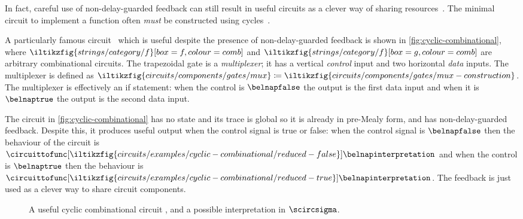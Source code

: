 \documentclass{lmcs}
\begin{document}
In fact, careful use of non-delay-guarded feedback can still result in useful
circuits as a clever way of sharing
resources~\cite{malik1994analysis,riedel2004cyclic,mendler2012constructive}.
The minimal circuit to implement a function often \emph{must} be
constructed using cycles~\cite{rivest1977necessity,riedel2003synthesis}.

\begin{exa}\label{ex:cyclic-combinational}
    A particularly famous circuit~\cite{malik1994analysis} which is useful
    despite the presence of non-delay-guarded feedback is shown in
    \autoref{fig:cyclic-combinational}, where \(
    \iltikzfig{strings/category/f}[box=f,colour=comb]
    \) and \(
    \iltikzfig{strings/category/f}[box=g,colour=comb]
    \) are arbitrary combinational circuits.
    The trapezoidal gate is a \emph{multiplexer}; it has a vertical
    \emph{control} input and two horizontal \emph{data} inputs.
    The multiplexer is defined as \(
    \iltikzfig{circuits/components/gates/mux}
    \coloneqq
    \iltikzfig{circuits/components/gates/mux-construction}
    \).
    The multiplexer is effectively an if statement: when the control is
    \(\belnapfalse\) the output is the first data input and when it is
    \(\belnaptrue\) the output is the second data input.

    The circuit in \autoref{fig:cyclic-combinational} has no state and its trace is
    global so it is already in pre-Mealy form, and has
    non-delay-guarded feedback.
    Despite this, it produces useful output when the control signal is true or
    false:
    when the control signal is \(\belnapfalse\) then the behaviour of the
    circuit is \(
    \circuittofunc[
        \iltikzfig{circuits/examples/cyclic-combinational/reduced-false}
    ]{\belnapinterpretation}
    \) and when the control is \(\belnaptrue\) then the behaviour is \(
    \circuittofunc[
        \iltikzfig{circuits/examples/cyclic-combinational/reduced-true}
    ]{\belnapinterpretation}
    \).
    The feedback is just used as a clever way to share circuit components.
\end{exa}

\begin{figure}
    \centering
    \quad
    \caption{
        A useful cyclic combinational circuit
        \cite[Fig. 1]{mendler2012constructive}, and a possible interpretation in
        \(\scircsigma\).
    }
    \label{fig:cyclic-combinational}
\end{figure}
\end{document}
